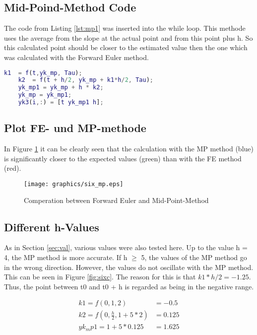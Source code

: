 		\subsection{Mid-Poind-Method Code}
		The code from Listing \ref{lst:mp1} was inserted into the while loop. This methode uses the average from the slope at the actual point and from this point plus h. So this calculated point should be closer to the estimated value then the one which was calculated with the Forward Euler method.
		
\begin{lstlisting}[caption={The funcion}, language=matlab, backgroundcolor = \color{lgray}, firstnumber=27, label={lst:mp1}]
	k1  = f(t,yk_mp, Tau);
	k2  = f(t + h/2, yk_mp + k1*h/2, Tau);  
	yk_mp1 = yk_mp + h * k2;
	yk_mp = yk_mp1;
	yk3(i,:) = [t yk_mp1 h];
\end{lstlisting}


		\subsection{Plot FE- und MP-methode}
		In Figure \ref{fig:sixmp} it can be clearly seen that the calculation with the MP method (blue) is significantly closer to the expected values (green) than with the FE method (red).
		
			\begin{figure}
				\centering
				\texttt{[image: graphics/six\_mp.eps]}
				\caption{Comperation between Forward Euler and Mid-Point-Method}
				\label{fig:sixmp}
			\end{figure}

	
		\subsection{Different h-Values}
		As in Section \ref{sec:val}, various values were also tested here. Up to the value h = 4, the MP method is more accurate. If h $\geq$ 5, the values of the MP method go in the wrong direction. However, the values do not oscillate with the MP method. This can be seen in Figure \ref{fig:sixc}.
		The reason for this is that $k1 * h / 2 = -1.25$. Thus, the point between t0 and t0 + h is regarded as being in the negative range.
		
		
			\begin{eqnarray}
				k1 = f\left( 0, 1, 2\right)  &= -0.5 \\
				k2 = f\left( 0, \frac{h}{2}, 1 + 5 * 2 \right) &= 0.125 \\
				yk_mp1 = 1 + 5 * 0.125 &= 1.625
			\end{eqnarray}
		
